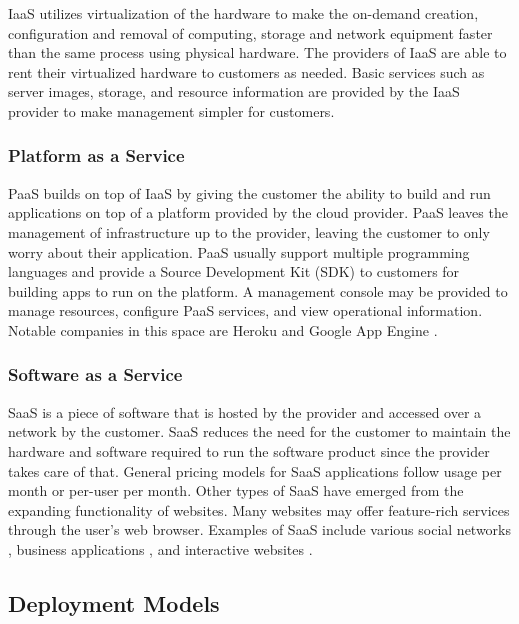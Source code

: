 \documentclass[12pt]{article}
\begin{document}
IaaS utilizes virtualization of the hardware to make the on-demand creation, configuration and removal of computing, storage and network equipment faster than the same process using physical hardware. The providers of IaaS are able to rent their virtualized hardware to customers as needed. Basic services such as server images, storage, and resource information are provided by the IaaS provider to make management simpler for customers.

\subsubsection{Platform as a Service} \label{ssub:paas}

PaaS builds on top of IaaS by giving the customer the ability to build and run applications on top of a platform provided by the cloud provider. PaaS leaves the management of infrastructure up to the provider, leaving the customer to only worry about their application. PaaS usually support multiple programming languages and provide a Source Development Kit (SDK) to customers for building apps to run on the platform. A management console may be provided to manage resources, configure PaaS services, and view operational information. Notable companies in this space are Heroku \cite{heroku} and Google App Engine \cite{googleappengine}.

\subsubsection{Software as a Service} \label{ssub:saas}

SaaS is a piece of software that is hosted by the provider and accessed over a network by the customer. SaaS reduces the need for the customer to maintain the hardware and software required to run the software product since the provider takes care of that. General pricing models for SaaS applications follow usage per month or per-user per month. Other types of SaaS have emerged from the expanding functionality of websites. Many websites may offer feature-rich services through the user's web browser. Examples of SaaS include various social networks \cite{facebook}, business applications \cite{salesforce}, and interactive websites \cite{netflix}.



\subsection{Deployment Models} \label{sub:deployment-model}
\end{document}
